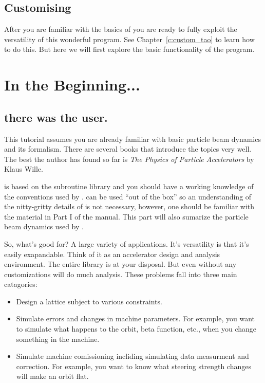\subsection{Customising \tao}

After you are familiar with the basics of \tao you are ready to fully exploit
the versatility of this wonderful program. See Chapter~\ref{c:custom_tao} to learn
how to do this. But here we will first explore the basic functionality of the
program.

\section{In the Beginning...}
\label{s:beginning}

\subsection{there was the user.}

This tutorial assumes you are already familiar with basic particle beam
dynamics and its formalism. There are several books that introduce the topics
very well. The best the author has found so far is \textit{The Physics of
Particle Accelerators} by Klaus Wille. 

\tao is based on the \bmad subroutine library and you should have
a working knowledge of the conventions used by \bmad. \tao can be used ``out of
the box'' so an understanding of the nitty-gritty details of \bmad is not
necessary, however, one should be familiar with the material in Part I
of the \bmad manual. This part will also sumarize the particle beam dynamics
used by \tao.

So, what's \tao good for? A large variety of applications. It's versatility is that
it's easily exapandable. Think of it as an accelerator design and analysis
environment. The entire \bmad library is at your disposal. But even without any 
customizations \tao will do much analysis. These problems fall into three main
catagories:

\begin{itemize}
\item 
Design a lattice subject to various constraints.
\item
Simulate errors and changes in machine parameters. For example, you want to
simulate what happens to the orbit, beta function, etc., when you change
something in the machine. 
\item 
Simulate machine comissioning incliding simulating data measurment and
correction. For example, you want to know what steering strength changes will
make an orbit flat.
\end{itemize}

